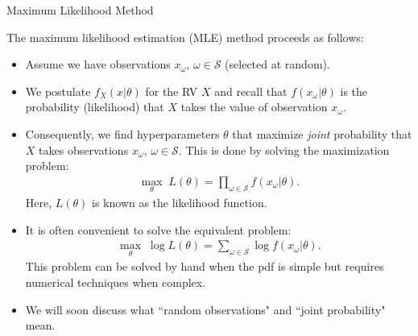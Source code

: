 \documentclass[9pt]{beamer}
\begin{document}
%
\begin{frame}{Maximum Likelihood Method}

The maximum likelihood estimation (MLE) method proceeds as follows:

\begin{itemize}
\item Assume we have observations $x_\omega,\, \omega \in \mathcal{S}$ (selected at random).
\item We postulate $f_X(x|\theta)$ for the RV $X$ and recall that $f(x_\omega|\theta)$ is the probability (likelihood) that $X$ takes the value of observation $x_\omega$.  

\item Consequently, we find hyperparameters $\theta$ that maximize {\em joint} probability that $X$ takes observations $x_\omega,\,\omega \in \mathcal{S}$. This is done by solving the maximization problem:
\begin{align*}
\max_\theta\; L(\theta)=\prod_{\omega \in \mathcal{S}}f(x_\omega|\theta).
\end{align*}
Here, $L(\theta)$ is known as the likelihood function. 

\item It is often convenient to solve the equivalent problem:
\begin{align*}
\max_\theta\; \log L(\theta)=\sum_{\omega \in \mathcal{S}}\log f(x_\omega|\theta).
\end{align*}
This problem can be solved by hand when the pdf is simple but requires numerical techniques when complex. 
\item We will soon discuss what ``random observations" and ``joint probability" mean. 
\end{itemize}

\end{frame}
\end{document}
